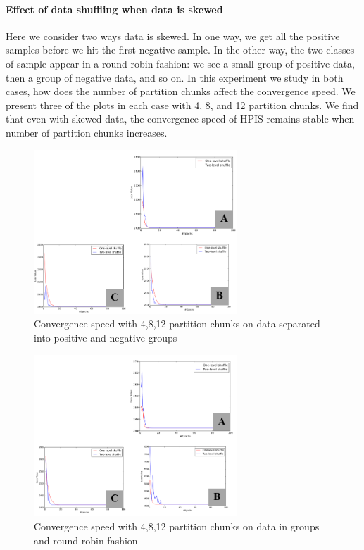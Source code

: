 \documentclass{vldb}
\begin{document}
\paragraph{Effect of data shuffling when data is skewed}

Here we consider two ways data is skewed. In one way, we get all the positive samples before we hit the first negative sample. In the other way, the two classes of sample appear in a round-robin fashion: we see a small group of positive data, then a group of negative data, and so on. In this experiment we study in both cases, how does the number of partition chunks affect the convergence speed. We present three of the plots in each case with 4, 8, and 12 partition chunks. We find that even with skewed data, the convergence speed of HPIS remains stable when number of partition chunks increases.

\begin{figure}[h]
\centering
\includegraphics[width=3.0in]{half_half}
\caption{Convergence speed with 4,8,12 partition chunks on data separated into positive and negative groups}
\end{figure}

\begin{figure}[h]
\centering
\includegraphics[width=3.0in]{skewed_chunk}
\caption{Convergence speed with 4,8,12 partition chunks on data in groups and round-robin fashion}
\end{figure}
\end{document}
